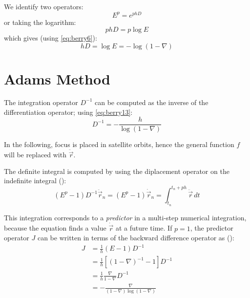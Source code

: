 We identify two operators:
\begin{equation}
  E^p = e^{phD}
\end{equation}
or taking the logarithm:
\begin{equation}
  p h D = p \log E
\end{equation}
which gives (using \ref{eq:berry6}):
\begin{equation}
  \label{eq:berry13}
  h D = \log E = - \log(1-\nabla)
\end{equation}

\section{Adams Method}
The integration operator \( D^{-1} \) can be computed as the inverse of the 
differentiation operator; using \ref{eq:berry13}:
\begin{equation}
  D^{-1} = - \frac{h}{\log(1-\nabla)}
\end{equation}

In the following, focus is placed in satellite orbits, hence the general function 
\( f \) will be replaced with \( \ddot{\vec{r}} \).

The definite integral is computed by using the diplacement operator on the indefinite 
integral (\cite{berry2004}):
\begin{equation}
  (E^p -1) D^{-1} \ddot{\vec{r}}_n = (E^p -1) \dot{\vec{r}}_n 
  = \int_{t_n}^{t_n +ph} \ddot{\vec{r}} \,dt
\end{equation}

This integration corresponds to a \emph{predictor} in a multi-step numerical 
integration, because the equation finds a value \( \dot{\vec{r}} \) at a future 
time. If \( p = 1 \), the predictor operator \( J \) can be written in terms of 
the backward difference operator as (\cite{berry2004}):
\begin{equation}
  \begin{aligned}
  J & = \frac{1}{h} (E-1) D^{-1} \\
    & = \frac{1}{h} [ {(1-\nabla)}^{-1} - 1 ] D^{-1} \\
    & = \frac{1}{h} \frac{\nabla}{1-\nabla}D^{-1} \\
    & = - \frac{\nabla}{(1-\nabla) \log(1-\nabla)}
  \end{aligned}
\end{equation}
